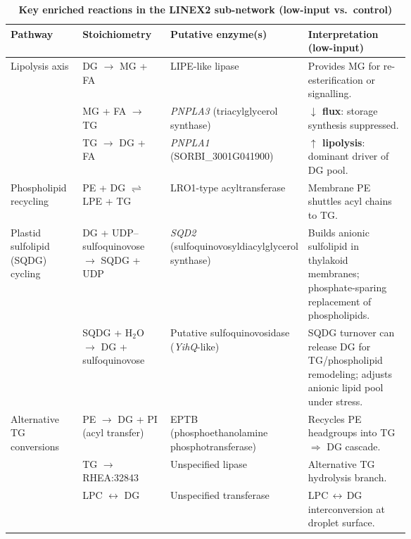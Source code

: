 \documentclass[10pt,letterpaper]{article}
\begin{document}
\begin{itemize}
\begin{table}[!ht]
  \centering
  \footnotesize
  \setlength{\tabcolsep}{4pt}
  \renewcommand{\arraystretch}{1.2}
  \caption{\textbf{Key enriched reactions in the LINEX2 sub-network (low-input vs.\ control)}}
  \label{tab:linex_reactions}
  \begin{tabularx}{\linewidth}{@{}%
      p{0.18\linewidth}
      p{0.22\linewidth}
      p{0.26\linewidth}
      X
    @{}}
    \toprule
    \textbf{Pathway} & \textbf{Stoichiometry} & \textbf{Putative enzyme(s)} & \textbf{Interpretation (low-input)} \\
    \midrule
    Lipolysis axis
      & DG $\rightarrow$ MG + FA
      & LIPE-like lipase
      & Provides MG for re-esterification or signalling. \\
    & MG + FA $\rightarrow$ TG
      & \textit{PNPLA3} (triacylglycerol synthase)
      & \textbf{$\downarrow$ flux}: storage synthesis suppressed. \\
    & TG $\rightarrow$ DG + FA
      & \textit{PNPLA1} (SORBI\_3001G041900)
      & \textbf{$\uparrow$ lipolysis}: dominant driver of DG pool. \\
    \addlinespace
    Phospholipid recycling
      & PE + DG $\rightleftharpoons$ LPE + TG
      & LRO1-type acyltransferase
      & Membrane PE shuttles acyl chains to TG. \\
    \addlinespace
    Plastid sulfolipid (SQDG) cycling
      & DG + UDP–sulfoquinovose $\rightarrow$ SQDG + UDP
      & \textit{SQD2} (sulfoquinovosyldiacylglycerol synthase)
      & Builds anionic sulfolipid in thylakoid membranes; phosphate-sparing replacement of phospholipids. \\
    & SQDG + H$_2$O $\rightarrow$ DG + sulfoquinovose
      & Putative sulfoquinovosidase (\textit{YihQ}-like)
      & SQDG turnover can release DG for TG/phospholipid remodeling; adjusts anionic lipid pool under stress. \\
    \addlinespace
    Alternative TG conversions
      & PE $\rightarrow$ DG + PI (acyl transfer)
      & EPTB (phosphoethanolamine phosphotransferase)
      & Recycles PE headgroups into TG $\Rightarrow$ DG cascade. \\
    & TG $\rightarrow$ RHEA:32843
      & Unspecified lipase
      & Alternative TG hydrolysis branch. \\
    & LPC $\leftrightarrow$ DG
      & Unspecified transferase
      & LPC\,$\leftrightarrow$\,DG interconversion at droplet surface. \\
    \bottomrule
  \end{tabularx}
\end{table}




\end{itemize}
\end{document}
